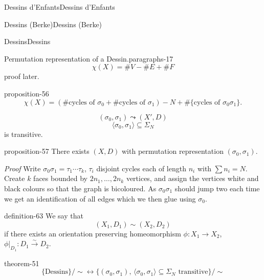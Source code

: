 \documentclass[10pt,]{book}
\makeatletter
\renewcommand*{\proofname}{Proof}
\renewenvironment{proof}[1][\proofname]{\par
  \pushQED{\qed}%
  \normalfont \topsep6\p@\@plus6\p@\relax
  \trivlist
  \item\relax
    {\itshape
    #1\@addpunct{.}}\hspace\labelsep\ignorespaces
}{%
  \popQED\endtrivlist\@endpefalse
}
\numberwithin{equation}{section}
\makeatother
\begin{document}
\begin{chapterptx}{Dessins d'Enfants}{}{Dessins d'Enfants}{}{}
\begin{sectionptx}{Dessins (Berke)}{}{Dessins (Berke)}{}{}
\begin{subsectionptx}{Dessins}{}{Dessins}{}{}
\begin{paragraphs}{Permutation representation of a Dessin.}{paragraphs-17}
\begin{equation*}
\chi (X) = \#V -  \#E  + \#F
\end{equation*}
proof later.%
\begin{proposition}{}{}{proposition-56}%
\hypertarget{p-647}{}%
%
\begin{equation*}
\chi(X) = (\#\text{cycles of }\sigma_0+\#\text{cycles of }\sigma_1) - N + \#\{\text{cycles of }\sigma_0\sigma_1\}\text{.}
\end{equation*}
%
\end{proposition}
\hypertarget{p-648}{}%
%
\begin{equation*}
(\sigma_0, \sigma_1) \leadsto (X',D)
\end{equation*}
%
\begin{equation*}
\langle \sigma_0, \sigma_1 \rangle \subseteq \Sigma_N
\end{equation*}
is transitive.%
\begin{proposition}{}{}{proposition-57}%
\hypertarget{p-649}{}%
There exists \((X,D)\) with permutation representation \((\sigma_0, \sigma_1)\).%
\end{proposition}
\begin{proof}\hypertarget{proof-97}{}
\hypertarget{p-650}{}%
Write \(\sigma_0\sigma_1 = \tau_1 \cdots \tau_k\), \(\tau_i\) disjoint cycles each of length \(n_i\) with \(\sum n_i = N\). Create \(k\) faces bounded by \(2n_1, \ldots, 2n_k\) vertices, and assign the vertices white and black colours so that the graph is bicoloured. As \(\sigma_0\sigma_1\) should jump two each time we get an identification of all edges which we then  glue using \(\sigma_0\).%
\end{proof}
\begin{definition}{}{definition-63}%
\hypertarget{p-651}{}%
We say that%
\begin{equation*}
(X_1, D_1) \sim (X_2, D_2)
\end{equation*}
if there exists an orientation preserving homeomorphism \(\phi \colon X_1 \to X_2\), \(\phi|_{D_1} \colon D_1 \xrightarrow\sim D_2\).%
\end{definition}
\begin{theorem}{}{}{theorem-51}%
\hypertarget{p-652}{}%
%
\begin{equation*}
\{\text{Dessins}\}/\sim \leftrightarrow \{( \sigma_0, \sigma_1),\,\langle \sigma_0, \sigma_1 \rangle \subseteq \Sigma_N \text{ transitive}\}/\sim
\end{equation*}
%
\end{theorem}
\end{paragraphs}%
\end{subsectionptx}

\end{sectionptx}
\end{chapterptx}
\end{document}
